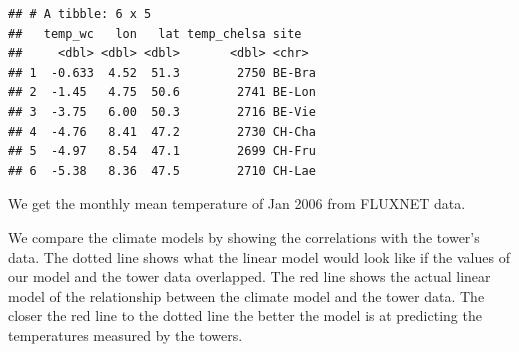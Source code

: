 \documentclass[
]{book}
\newenvironment{Shaded}{\begin{snugshade}}{\end{snugshade}}
\newcommand{\CommentTok}[1]{\textcolor[rgb]{0.56,0.35,0.01}{\textit{#1}}}
\newcommand{\DataTypeTok}[1]{\textcolor[rgb]{0.13,0.29,0.53}{#1}}
\newcommand{\DecValTok}[1]{\textcolor[rgb]{0.00,0.00,0.81}{#1}}
\newcommand{\KeywordTok}[1]{\textcolor[rgb]{0.13,0.29,0.53}{\textbf{#1}}}
\newcommand{\NormalTok}[1]{#1}
\newcommand{\OperatorTok}[1]{\textcolor[rgb]{0.81,0.36,0.00}{\textbf{#1}}}
\newcommand{\StringTok}[1]{\textcolor[rgb]{0.31,0.60,0.02}{#1}}
\begin{document}
\begin{verbatim}
## # A tibble: 6 x 5
##   temp_wc   lon   lat temp_chelsa site  
##     <dbl> <dbl> <dbl>       <dbl> <chr> 
## 1  -0.633  4.52  51.3        2750 BE-Bra
## 2  -1.45   4.75  50.6        2741 BE-Lon
## 3  -3.75   6.00  50.3        2716 BE-Vie
## 4  -4.76   8.41  47.2        2730 CH-Cha
## 5  -4.97   8.54  47.1        2699 CH-Fru
## 6  -5.38   8.36  47.5        2710 CH-Lae
\end{verbatim}

We get the monthly mean temperature of Jan 2006 from FLUXNET data.

\begin{Shaded}
\end{Shaded}

We compare the climate models by showing the correlations with the tower's data. The dotted line shows what the linear model would look like if the values of our model and the tower data overlapped. The red line shows the actual linear model of the relationship between the climate model and the tower data. The closer the red line to the dotted line the better the model is at predicting the temperatures measured by the towers.
\end{document}
